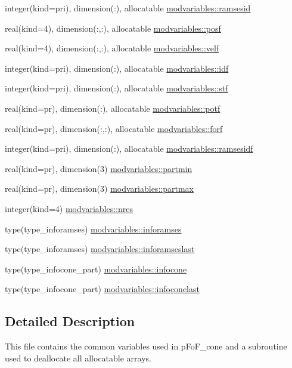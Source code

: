 \begin{DoxyCompactItemize}
\item 
integer(kind=pri), dimension(\+:), allocatable \hyperlink{namespacemodvariables_ae6b45a68a4cbf0ccbbf7c08ee87e3573}{modvariables\+::ramsesid}
\item 
real(kind=4), dimension(\+:,\+:), allocatable \hyperlink{namespacemodvariables_a7528c234a190760e036921b956ec9fe8}{modvariables\+::posf}
\item 
real(kind=4), dimension(\+:,\+:), allocatable \hyperlink{namespacemodvariables_a99c2bd91d22daa7bfaa3491624db7f14}{modvariables\+::velf}
\item 
integer(kind=pri), dimension(\+:), allocatable \hyperlink{namespacemodvariables_a74cd7fb485e34ae685664db5b2629aa9}{modvariables\+::idf}
\item 
integer(kind=pri), dimension(\+:), allocatable \hyperlink{namespacemodvariables_a5b99e0cc82073c06969e0fe6caa06357}{modvariables\+::stf}
\item 
real(kind=pr), dimension(\+:), allocatable \hyperlink{namespacemodvariables_a719beead34fb4c6c7c70e7f51f1dfc78}{modvariables\+::potf}
\item 
real(kind=pr), dimension(\+:,\+:), allocatable \hyperlink{namespacemodvariables_a1f2453280a3af1c380a1c3ad4797dc4b}{modvariables\+::forf}
\item 
integer(kind=pri), dimension(\+:), allocatable \hyperlink{namespacemodvariables_a960cf3d5497024438caba54185cd7793}{modvariables\+::ramsesidf}
\item 
real(kind=pr), dimension(3) \hyperlink{namespacemodvariables_a70ddcf7f533c219df5c249774ff81df1}{modvariables\+::partmin}
\item 
real(kind=pr), dimension(3) \hyperlink{namespacemodvariables_abeabad3e2598f3abb4a4fa74adca7743}{modvariables\+::partmax}
\item 
integer(kind=4) \hyperlink{namespacemodvariables_aa678ff0ebe26f3b0510eba5a59a69e61}{modvariables\+::nres}
\item 
type(type\+\_\+inforamses) \hyperlink{namespacemodvariables_ac84b14c43266126c4d7120ba0b8f48f4}{modvariables\+::inforamses}
\item 
type(type\+\_\+inforamses) \hyperlink{namespacemodvariables_a0640750979390f0e918c322d27b0bf74}{modvariables\+::inforamseslast}
\item 
type(type\+\_\+infocone\+\_\+part) \hyperlink{namespacemodvariables_a9c451543a6252b72d4a5352333c718b9}{modvariables\+::infocone}
\item 
type(type\+\_\+infocone\+\_\+part) \hyperlink{namespacemodvariables_acecda25ec5fba6f5f5fcaa09b2aba3a2}{modvariables\+::infoconelast}
\end{DoxyCompactItemize}


\subsection{Detailed Description}
This file contains the common variables used in p\+Fo\+F\+\_\+cone and a subroutine used to deallocate all allocatable arrays. 

